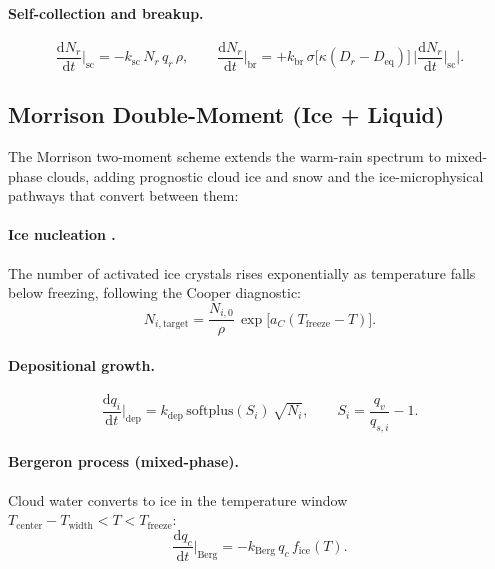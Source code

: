 \documentclass[11pt,twoside]{report}
\newcommand{\dd}{\mathrm{d}}
\begin{document}
\paragraph{Self-collection and breakup.}
\begin{equation}
  \frac{\dd N_r}{\dd t}\bigg|_{\mathrm{sc}}
  = -k_{\mathrm{sc}}\,N_r\,q_r\,\rho,
  \qquad
  \frac{\dd N_r}{\dd t}\bigg|_{\mathrm{br}}
  = +k_{\mathrm{br}}\,\sigma\bigl[\kappa(D_r-D_{\mathrm{eq}})\bigr]\,
  \bigl|\frac{\dd N_r}{\dd t}\big|_{\mathrm{sc}}\bigr|.
\end{equation}

\subsection{Morrison Double-Moment (Ice + Liquid)}

The Morrison two-moment scheme \citep{Morrison2005} extends the warm-rain
spectrum to mixed-phase clouds, adding prognostic cloud ice and snow and the
ice-microphysical pathways that convert between them:

\paragraph{Ice nucleation \citep{Cooper1986}.}
The number of activated ice crystals rises exponentially as temperature falls
below freezing, following the Cooper diagnostic:
\begin{equation}
  N_{i,\mathrm{target}} = \frac{N_{i,0}}{\rho}\,
  \exp\!\bigl[a_C(T_{\mathrm{freeze}}-T)\bigr].
\end{equation}

\paragraph{Depositional growth.}
\begin{equation}
  \frac{\dd q_i}{\dd t}\bigg|_{\mathrm{dep}}
  = k_{\mathrm{dep}}\,\mathrm{softplus}(S_i)\,\sqrt{N_i},
  \qquad S_i = \frac{q_v}{q_{s,i}}-1.
\end{equation}

\paragraph{Bergeron process (mixed-phase).}
Cloud water converts to ice in the temperature window
$T_{\mathrm{center}}-T_{\mathrm{width}} < T < T_{\mathrm{freeze}}$:
\begin{equation}
  \frac{\dd q_c}{\dd t}\bigg|_{\mathrm{Berg}}
  = -k_{\mathrm{Berg}}\,q_c\,f_{\mathrm{ice}}(T).
\end{equation}
\end{document}
